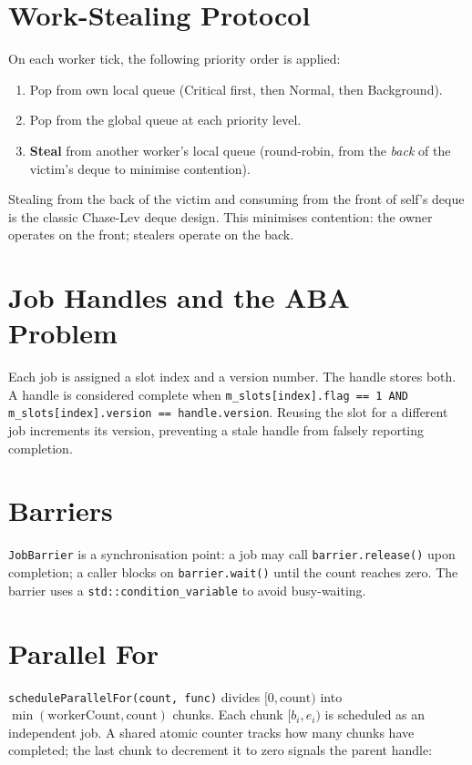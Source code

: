 \documentclass[12pt, a4paper]{report}
\theoremstyle{definition}
\theoremstyle{remark}
\begin{document}
\section{Work-Stealing Protocol}

On each worker tick, the following priority order is applied:

\begin{enumerate}
  \item Pop from own local queue (Critical first, then Normal, then Background).
  \item Pop from the global queue at each priority level.
  \item \textbf{Steal} from another worker's local queue (round-robin,
        from the \emph{back} of the victim's deque to minimise contention).
\end{enumerate}

Stealing from the back of the victim and consuming from the front of
self's deque is the classic Chase-Lev deque design. This minimises
contention: the owner operates on the front; stealers operate on the
back.

\section{Job Handles and the ABA Problem}

Each job is assigned a slot index and a version number.
The handle stores both. A handle is considered complete when
\texttt{m\_slots[index].flag == 1 AND m\_slots[index].version == handle.version}.
Reusing the slot for a different job increments its version, preventing
a stale handle from falsely reporting completion.

\section{Barriers}

\texttt{JobBarrier} is a synchronisation point: a job may call
\texttt{barrier.release()} upon completion; a caller blocks on
\texttt{barrier.wait()} until the count reaches zero.
The barrier uses a \texttt{std::condition\_variable} to avoid busy-waiting.

\section{Parallel For}

\texttt{scheduleParallelFor(count, func)} divides $[0, \text{count})$
into $\min(\text{workerCount}, \text{count})$ chunks. Each chunk
$[b_i, e_i)$ is scheduled as an independent job. A shared atomic counter
tracks how many chunks have completed; the last chunk to decrement it
to zero signals the parent handle:
\end{document}
